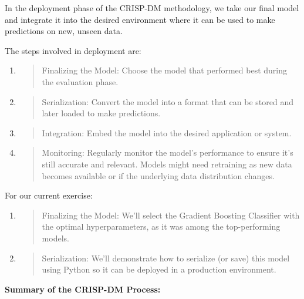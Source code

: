 \documentclass[]{article}
\newcommand{\textcenter}[1]{\begin{center} \vspace{10px}\textbf{\large #1} \end{center}}
\begin{document}
In the deployment phase of the CRISP-DM methodology, we take our final
model and integrate it into the desired environment where it can be used
to make predictions on new, unseen data.

The steps involved in deployment are:

\begin{enumerate}
\def\labelenumi{\arabic{enumi}.}
\item
  \begin{quote}
  Finalizing the Model: Choose the model that performed best during the
  evaluation phase.
  \end{quote}
\item
  \begin{quote}
  Serialization: Convert the model into a format that can be stored and
  later loaded to make predictions.
  \end{quote}
\item
  \begin{quote}
  Integration: Embed the model into the desired application or system.
  \end{quote}
\item
  \begin{quote}
  Monitoring: Regularly monitor the model's performance to ensure it's
  still accurate and relevant. Models might need retraining as new data
  becomes available or if the underlying data distribution changes.
  \end{quote}
\end{enumerate}

For our current exercise:

\begin{enumerate}
\def\labelenumi{\arabic{enumi}.}
\item
  \begin{quote}
  Finalizing the Model: We'll select the Gradient Boosting Classifier
  with the optimal hyperparameters, as it was among the top-performing
  models.
  \end{quote}
\item
  \begin{quote}
  Serialization: We'll demonstrate how to serialize (or save) this model
  using Python so it can be deployed in a production environment.
  \end{quote}
\end{enumerate}

\textcenter{Summary of the CRISP-DM Process:}
\end{document}
